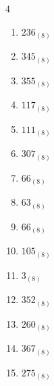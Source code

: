 \begin{multicols}{4}
\begin{enumerate}
        \phantom{$=34$}

  \item $236_{(8)}$

        \phantom{$=158$}

  \item $345_{(8)}$

        \phantom{$=229$}

  \item $355_{(8)}$

        \phantom{$=237$}

  \item $117_{(8)}$

        \phantom{$=79$}

  \item $111_{(8)}$

        \phantom{$=73$}

\columnbreak %

  \item $307_{(8)}$

        \phantom{$=199$}

  \item $66_{(8)}$

        \phantom{$=54$}

  \item $63_{(8)}$

        \phantom{$=51$}

  \item $66_{(8)}$

        \phantom{$=54$}

  \item $105_{(8)}$

        \phantom{$=69$}

  \item $3_{(8)}$

        \phantom{$=3$}

  \item $352_{(8)}$

        \phantom{$=234$}

  \item $260_{(8)}$

        \phantom{$=176$}

  \item $367_{(8)}$

        \phantom{$=247$}

  \item $275_{(8)}$

        \phantom{$=189$}


\end{enumerate}
\end{multicols}
